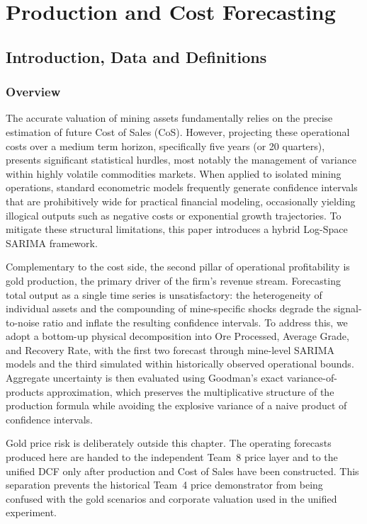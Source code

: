 \chapter{Production and Cost Forecasting}
\sourceassetnote
\section{Introduction, Data and Definitions}
\subsection{Overview}
The accurate valuation of mining assets fundamentally relies on the precise estimation of future Cost of Sales (CoS). However, projecting these operational costs over a medium term horizon, specifically five years (or 20 quarters), presents significant statistical hurdles, most notably the management of variance within highly volatile commodities markets. When applied to isolated mining operations, standard econometric models frequently generate confidence intervals that are prohibitively wide for practical financial modeling, occasionally yielding illogical outputs such as negative costs or exponential growth trajectories. To mitigate these structural limitations, this paper introduces a hybrid Log-Space SARIMA framework.

Complementary to the cost side, the second pillar of operational profitability is gold production, the primary driver of the firm's revenue stream. Forecasting total output as a single time series is unsatisfactory: the heterogeneity of individual assets and the compounding of mine-specific shocks degrade the signal-to-noise ratio and inflate the resulting confidence intervals. To address this, we adopt a bottom-up physical decomposition into Ore Processed, Average Grade, and Recovery Rate, with the first two forecast through mine-level SARIMA models and the third simulated within historically observed operational bounds. Aggregate uncertainty is then evaluated using Goodman's exact variance-of-products approximation, which preserves the multiplicative structure of the production formula while avoiding the explosive variance of a naive product of confidence intervals.

Gold price risk is deliberately outside this chapter. The operating forecasts produced here are handed to the independent Team~8 price layer and to the unified DCF only after production and Cost of Sales have been constructed. This separation prevents the historical Team~4 price demonstrator from being confused with the gold scenarios and corporate valuation used in the unified experiment.
